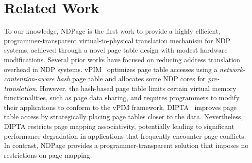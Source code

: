 \section{Related Work}
To our knowledge, NDPage is the first work to provide a highly efficient, programmer-transparent virtual-to-physical translation mechanism for NDP systems, achieved through a novel page table design with modest hardware modifications. 
Several prior works have focused on reducing address translation overhead in NDP systems. 
vPIM~\cite{fatima2023vpim} optimizes page table accesses using a \textit{network-contention-aware hash} page table and allocates some NDP cores for \textit{pre-translation}. 
However, the hash-based page table limits certain virtual memory functionalities, such as page data sharing, and requires programmers to modify their applications to conform to the vPIM framework. 
DIPTA~\cite{picorel2017near} improves page table access by strategically placing page tables closer to the data. 
Nevertheless, DIPTA restricts page mapping associativity, potentially leading to significant performance degradation in applications that frequently encounter page conflicts. 
In contrast, NDPage provides a programmer-transparent solution that imposes no restrictions on page mapping.